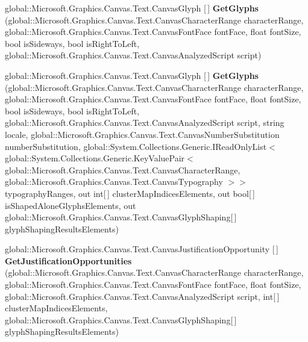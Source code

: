 \begin{DoxyCompactItemize}
global\+::\+Microsoft.\+Graphics.\+Canvas.\+Text.\+Canvas\+Glyph \mbox{[}$\,$\mbox{]} {\bfseries Get\+Glyphs} (global\+::\+Microsoft.\+Graphics.\+Canvas.\+Text.\+Canvas\+Character\+Range character\+Range, global\+::\+Microsoft.\+Graphics.\+Canvas.\+Text.\+Canvas\+Font\+Face font\+Face, float font\+Size, bool is\+Sideways, bool is\+Right\+To\+Left, global\+::\+Microsoft.\+Graphics.\+Canvas.\+Text.\+Canvas\+Analyzed\+Script script)
\item 
\mbox{\label{class_microsoft_1_1_graphics_1_1_canvas_1_1_text_1_1_canvas_text_analyzer_a96ffee25bbe4a0df427e23a2c2493f0b}} 
global\+::\+Microsoft.\+Graphics.\+Canvas.\+Text.\+Canvas\+Glyph \mbox{[}$\,$\mbox{]} {\bfseries Get\+Glyphs} (global\+::\+Microsoft.\+Graphics.\+Canvas.\+Text.\+Canvas\+Character\+Range character\+Range, global\+::\+Microsoft.\+Graphics.\+Canvas.\+Text.\+Canvas\+Font\+Face font\+Face, float font\+Size, bool is\+Sideways, bool is\+Right\+To\+Left, global\+::\+Microsoft.\+Graphics.\+Canvas.\+Text.\+Canvas\+Analyzed\+Script script, string locale, global\+::\+Microsoft.\+Graphics.\+Canvas.\+Text.\+Canvas\+Number\+Substitution number\+Substitution, global\+::\+System.\+Collections.\+Generic.\+I\+Read\+Only\+List$<$ global\+::\+System.\+Collections.\+Generic.\+Key\+Value\+Pair$<$ global\+::\+Microsoft.\+Graphics.\+Canvas.\+Text.\+Canvas\+Character\+Range, global\+::\+Microsoft.\+Graphics.\+Canvas.\+Text.\+Canvas\+Typography $>$$>$ typography\+Ranges, out int\mbox{[}$\,$\mbox{]} cluster\+Map\+Indices\+Elements, out bool\mbox{[}$\,$\mbox{]} is\+Shaped\+Alone\+Glyphs\+Elements, out global\+::\+Microsoft.\+Graphics.\+Canvas.\+Text.\+Canvas\+Glyph\+Shaping\mbox{[}$\,$\mbox{]} glyph\+Shaping\+Results\+Elements)
\item 
\mbox{\label{class_microsoft_1_1_graphics_1_1_canvas_1_1_text_1_1_canvas_text_analyzer_ab8294f1044be5a3f03e8601c5a48811a}} 
global\+::\+Microsoft.\+Graphics.\+Canvas.\+Text.\+Canvas\+Justification\+Opportunity \mbox{[}$\,$\mbox{]} {\bfseries Get\+Justification\+Opportunities} (global\+::\+Microsoft.\+Graphics.\+Canvas.\+Text.\+Canvas\+Character\+Range character\+Range, global\+::\+Microsoft.\+Graphics.\+Canvas.\+Text.\+Canvas\+Font\+Face font\+Face, float font\+Size, global\+::\+Microsoft.\+Graphics.\+Canvas.\+Text.\+Canvas\+Analyzed\+Script script, int\mbox{[}$\,$\mbox{]} cluster\+Map\+Indices\+Elements, global\+::\+Microsoft.\+Graphics.\+Canvas.\+Text.\+Canvas\+Glyph\+Shaping\mbox{[}$\,$\mbox{]} glyph\+Shaping\+Results\+Elements)
$$
\end{DoxyCompactItemize}
